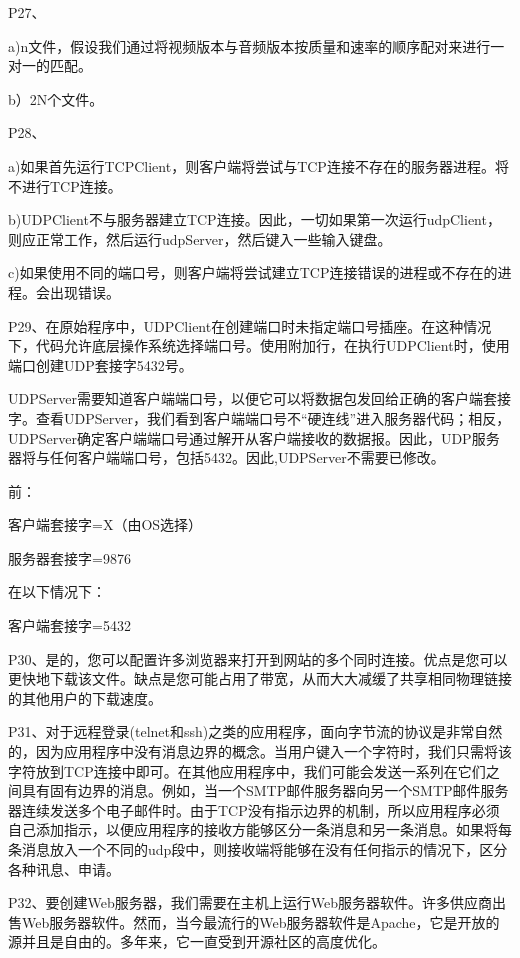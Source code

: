 \documentclass[11pt,UTF8,twoside]{article}
\begin{document}
	P27、
	
	a)n文件，假设我们通过将视频版本与音频版本按质量和速率的顺序配对来进行一对一的匹配。
	
	b）2N个文件。
	
	P28、
	
	a)如果首先运行TCPClient，则客户端将尝试与TCP连接不存在的服务器进程。将不进行TCP连接。
	
	b)UDPClient不与服务器建立TCP连接。因此，一切如果第一次运行udpClient，则应正常工作，然后运行udpServer，然后键入一些输入键盘。
	
	c)如果使用不同的端口号，则客户端将尝试建立TCP连接错误的进程或不存在的进程。会出现错误。
	
	P29、在原始程序中，UDPClient在创建端口时未指定端口号插座。在这种情况下，代码允许底层操作系统选择端口号。使用附加行，在执行UDPClient时，使用端口创建UDP套接字5432号。
	
	UDPServer需要知道客户端端口号，以便它可以将数据包发回给正确的客户端套接字。查看UDPServer，我们看到客户端端口号不“硬连线”进入服务器代码；相反，UDPServer确定客户端端口号通过解开从客户端接收的数据报。因此，UDP服务器将与任何客户端端口号，包括5432。因此,UDPServer不需要已修改。
	
	前：
	
	客户端套接字=X（由OS选择）
	
	服务器套接字=9876
	
	在以下情况下：
	
	客户端套接字=5432
	
	P30、是的，您可以配置许多浏览器来打开到网站的多个同时连接。优点是您可以更快地下载该文件。缺点是您可能占用了带宽，从而大大减缓了共享相同物理链接的其他用户的下载速度。
	
	P31、对于远程登录(telnet和ssh)之类的应用程序，面向字节流的协议是非常自然的，因为应用程序中没有消息边界的概念。当用户键入一个字符时，我们只需将该字符放到TCP连接中即可。在其他应用程序中，我们可能会发送一系列在它们之间具有固有边界的消息。例如，当一个SMTP邮件服务器向另一个SMTP邮件服务器连续发送多个电子邮件时。由于TCP没有指示边界的机制，所以应用程序必须自己添加指示，以便应用程序的接收方能够区分一条消息和另一条消息。如果将每条消息放入一个不同的udp段中，则接收端将能够在没有任何指示的情况下，区分各种讯息、申请。
	
	P32、要创建Web服务器，我们需要在主机上运行Web服务器软件。许多供应商出售Web服务器软件。然而，当今最流行的Web服务器软件是Apache，它是开放的源并且是自由的。多年来，它一直受到开源社区的高度优化。
	
	\newpage
	\pagestyle{fancy}
	\fancyhf{}  %
	\pagestyle{fancy}
	
\end{document}
